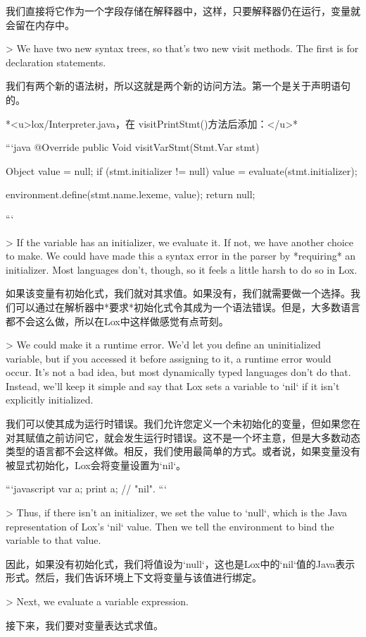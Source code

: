 \documentclass[cn,11pt,chinese]{elegantbook}
\begin{document}
{{{{{{{我们直接将它作为一个字段存储在解释器中，这样，只要解释器仍在运行，变量就会留在内存中。

> We have two new syntax trees, so that’s two new visit methods. The first is for declaration statements.

我们有两个新的语法树，所以这就是两个新的访问方法。第一个是关于声明语句的。

*<u>lox/Interpreter.java，在 visitPrintStmt()方法后添加：</u>*

```java
  @Override
  public Void visitVarStmt(Stmt.Var stmt) {
    Object value = null;
    if (stmt.initializer != null) {
      value = evaluate(stmt.initializer);
    }

    environment.define(stmt.name.lexeme, value);
    return null;
  }
```

> If the variable has an initializer, we evaluate it. If not, we have another choice to make. We could have made this a syntax error in the parser by *requiring* an initializer. Most languages don’t, though, so it feels a little harsh to do so in Lox.

如果该变量有初始化式，我们就对其求值。如果没有，我们就需要做一个选择。我们可以通过在解析器中*要求*初始化式令其成为一个语法错误。但是，大多数语言都不会这么做，所以在Lox中这样做感觉有点苛刻。

> We could make it a runtime error. We’d let you define an uninitialized variable, but if you accessed it before assigning to it, a runtime error would occur. It’s not a bad idea, but most dynamically typed languages don’t do that. Instead, we’ll keep it simple and say that Lox sets a variable to `nil` if it isn’t explicitly initialized.

我们可以使其成为运行时错误。我们允许您定义一个未初始化的变量，但如果您在对其赋值之前访问它，就会发生运行时错误。这不是一个坏主意，但是大多数动态类型的语言都不会这样做。相反，我们使用最简单的方式。或者说，如果变量没有被显式初始化，Lox会将变量设置为`nil`。

```javascript
var a;
print a; // "nil".
```

> Thus, if there isn’t an initializer, we set the value to `null`, which is the Java representation of Lox’s `nil` value. Then we tell the environment to bind the variable to that value.

因此，如果没有初始化式，我们将值设为`null`，这也是Lox中的`nil`值的Java表示形式。然后，我们告诉环境上下文将变量与该值进行绑定。

> Next, we evaluate a variable expression.

接下来，我们要对变量表达式求值。

}}}}}}}
\end{document}
